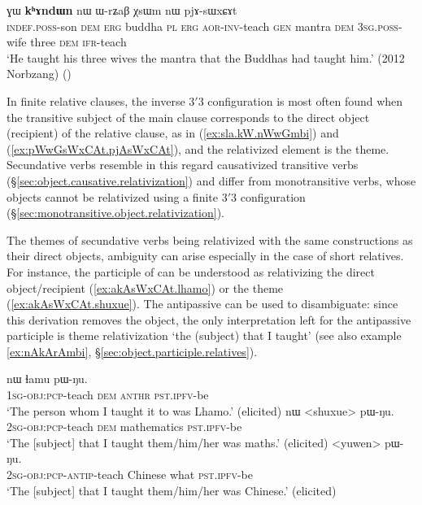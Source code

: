  
\begin{exe}
\ex \label{ex:pWwGsWxCAt.pjAsWxCAt}
 ɣɯ \textbf{kʰɤndɯn} nɯ ɯ-rʑaβ χsɯm nɯ pjɤ-sɯxɕɤt \\
\textsc{indef}.\textsc{poss}-son \textsc{dem} \textsc{erg} buddha \textsc{pl} \textsc{erg} \textsc{aor}-\textsc{inv}-teach \textsc{gen} mantra \textsc{dem} \textsc{3sg}.\textsc{poss}-wife three \textsc{dem} \textsc{ifr}-teach \\
\glt `He taught his three wives the mantra that the Buddhas had taught him.' (2012 Norbzang)
()
\end{exe} 

In finite relative clauses, the inverse 3$'$\fl{}3 configuration is most often found when the transitive subject of the main clause corresponds to the direct object (recipient) of the relative clause, as in (\ref{ex:sla.kW.nWwGmbi}) and (\ref{ex:pWwGsWxCAt.pjAsWxCAt}), and the relativized element is the theme. Secundative verbs resemble in this regard causativized transitive verbs (§\ref{sec:object.causative.relativization}) and differ from monotransitive verbs, whose objects cannot be relativized using a finite  3$'$\fl{}3 configuration (§\ref{sec:monotransitive.object.relativization}).

The themes of secundative verbs being relativized with the same constructions as their direct objects, ambiguity can arise especially in the case of short relatives. For instance, the participle  of  can be understood as relativizing the direct object/recipient (\ref{ex:akAsWxCAt.lhamo}) or the theme (\ref{ex:akAsWxCAt.shuxue}). The antipassive can be used to disambiguate: since this derivation removes the object, the only interpretation left for the antipassive participle  is theme relativization `the (subject) that I taught' (see also example \ref{ex:nAkArAmbi}, §\ref{sec:object.participle.relatives}).

\begin{exe}
\ex 
\begin{xlist}
\ex \label{ex:akAsWxCAt.lhamo}
\gll  [a-kɤ-sɯxɕɤt] nɯ ɬamu pɯ-ŋu. \\
\textsc{1sg}-\textsc{obj}:\textsc{pcp}-teach \textsc{dem}  \textsc{anthr} \textsc{pst}.\textsc{ipfv}-be \\
\glt `The person whom I taught it to was Lhamo.' (elicited)
\ex \label{ex:akAsWxCAt.shuxue}
\gll  [a-kɤ-sɯxɕɤt] nɯ  <shuxue> pɯ-ŋu. \\
\textsc{2sg}-\textsc{obj}:\textsc{pcp}-teach \textsc{dem} mathematics \textsc{pst}.\textsc{ipfv}-be \\
\glt `The [subject] that I taught them/him/her was maths.' (elicited)
\ex \label{ex:akAsAsWxCAt}
\gll [a-kɤ-sɤ-sɯxɕɤt] <yuwen>  pɯ-ŋu. \\
\textsc{2sg}-\textsc{obj}:\textsc{pcp}-\textsc{antip}-teach Chinese what \textsc{pst}.\textsc{ipfv}-be \\
\glt `The [subject] that I taught them/him/her was Chinese.' (elicited)
\end{xlist} 
\end{exe} 


